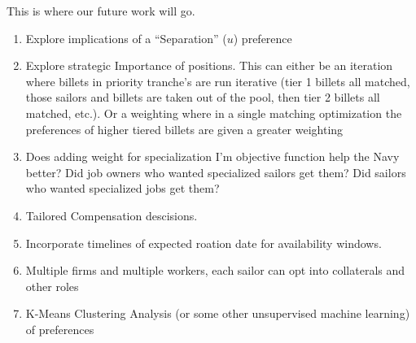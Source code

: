 This is where our future work will go.

\begin{enumerate}

\item Explore implications of a ``Separation'' ($u$) preference

\item Explore strategic Importance of positions. This can either be an iteration where billets in priority tranche's are run iterative (tier 1 billets all matched, those sailors and billets are taken out of the pool, then tier 2 billets all matched, etc.). Or a weighting where in a single matching optimization the preferences of higher tiered billets are given a greater weighting

\item Does adding weight for specialization I’m objective function help the Navy better? Did job owners who wanted specialized sailors get them? Did sailors who wanted specialized jobs get them?

\item Tailored Compensation descisions. 

\item Incorporate timelines of expected roation date for availability windows.

\item Multiple firms and multiple workers, each sailor can opt into collaterals and other roles \cite{1982_Roth}

\item K-Means Clustering Analysis (or some other unsupervised machine learning) of preferences  

\end{enumerate}
